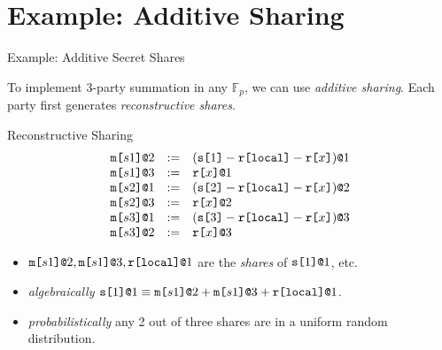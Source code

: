 \documentclass{beamer}
\begin{document}
\section{Example: Additive Sharing}
\begin{frame}{Example: Additive Secret Shares}

  To implement 3-party summation in any $\mathbb{F}_p$, we can use \emph{additive sharing}.
  Each party first generates \emph{reconstructive shares}.
  
  \begin{block}{Reconstructive Sharing}
    $$
    \begin{array}{lll}
      \texttt{m[}s1\texttt{]}\texttt{@}2 &:=& (\texttt{s[}1\texttt{]} - \texttt{r[}\mathtt{local}\texttt{]} - \texttt{r[}x\texttt{]})\texttt{@}1 \\ 
      \texttt{m[}s1\texttt{]}\texttt{@}3 &:=& \texttt{r[}x\texttt{]}\texttt{@}1 \\ 
      \texttt{m[}s2\texttt{]}\texttt{@}1 &:=& (\texttt{s[}2\texttt{]} - \texttt{r[}\mathtt{local}\texttt{]} - \texttt{r[}x\texttt{]})\texttt{@}2 \\ 
      \texttt{m[}s2\texttt{]}\texttt{@}3 &:=& \texttt{r[}x\texttt{]}\texttt{@}2 \\ 
      \texttt{m[}s3\texttt{]}\texttt{@}1 &:=& (\texttt{s[}3\texttt{]} - \texttt{r[}\mathtt{local}\texttt{]} - \texttt{r[}x\texttt{]})\texttt{@}3 \\ 
      \texttt{m[}s3\texttt{]}\texttt{@}2 &:=& \texttt{r[}x\texttt{]}\texttt{@}3
    \end{array}
    $$
  \end{block}
  \begin{itemize}
  \item $\texttt{m[}s1\texttt{]}\texttt{@}2, \texttt{m[}s1\texttt{]}\texttt{@}3, \texttt{r[}\mathtt{local}\texttt{]}\texttt{@}1$ are the \emph{shares} of $\texttt{s[}1\texttt{]}\texttt{@}1$,
    etc.
  \item \emph{algebraically} $\texttt{s[}1\texttt{]}\texttt{@}1 \equiv \texttt{m[}s1\texttt{]}\texttt{@}2 + \texttt{m[}s1\texttt{]}\texttt{@}3 + \texttt{r[}\mathtt{local}\texttt{]}\texttt{@}1$.
  \item \emph{probabilistically} any 2 out of three shares are in a uniform random distribution.
  \end{itemize}
  
\end{frame}
\end{document}
